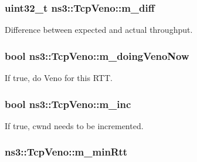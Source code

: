 \subsubsection[{\texorpdfstring{m\+\_\+diff}{m_diff}}]{\setlength{\rightskip}{0pt plus 5cm}uint32\+\_\+t ns3\+::\+Tcp\+Veno\+::m\+\_\+diff\hspace{0.3cm}{\ttfamily [private]}}\hypertarget{classns3_1_1TcpVeno_ae98841fe53c815c3d754675d2857ac80}{}\label{classns3_1_1TcpVeno_ae98841fe53c815c3d754675d2857ac80}


Difference between expected and actual throughput. 

\subsubsection[{\texorpdfstring{m\+\_\+doing\+Veno\+Now}{m_doingVenoNow}}]{\setlength{\rightskip}{0pt plus 5cm}bool ns3\+::\+Tcp\+Veno\+::m\+\_\+doing\+Veno\+Now\hspace{0.3cm}{\ttfamily [private]}}\hypertarget{classns3_1_1TcpVeno_aaf29a4f390edec44d3b5db1a70a5d119}{}\label{classns3_1_1TcpVeno_aaf29a4f390edec44d3b5db1a70a5d119}


If true, do Veno for this R\+TT. 

\subsubsection[{\texorpdfstring{m\+\_\+inc}{m_inc}}]{\setlength{\rightskip}{0pt plus 5cm}bool ns3\+::\+Tcp\+Veno\+::m\+\_\+inc\hspace{0.3cm}{\ttfamily [private]}}\hypertarget{classns3_1_1TcpVeno_a0962710ab039eac65735fb61bbe850b2}{}\label{classns3_1_1TcpVeno_a0962710ab039eac65735fb61bbe850b2}


If true, cwnd needs to be incremented. 

\subsubsection[{\texorpdfstring{m\+\_\+min\+Rtt}{m_minRtt}}]{ ns3\+::\+Tcp\+Veno\+::m\+\_\+min\+Rtt\hspace{0.3cm}{\ttfamily [private]}}\hypertarget{classns3_1_1TcpVeno_a9fd4b7308b7f0b7cd4179d6f65aba383}{}\label{classns3_1_1TcpVeno_a9fd4b7308b7f0b7cd4179d6f65aba383}


